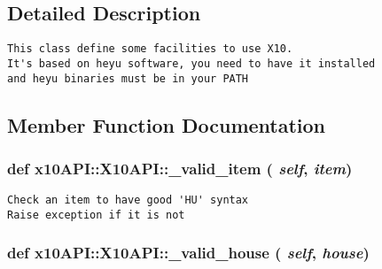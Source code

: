 \subsection{Detailed Description}


\footnotesize\begin{verbatim}
This class define some facilities to use X10.
It's based on heyu software, you need to have it installed
and heyu binaries must be in your PATH
\end{verbatim}
\normalsize
 

\subsection{Member Function Documentation}
\hypertarget{classx10API_1_1X10API_398d98e0674a6cefaef1154eafe94a15}{
\subsubsection[\_\-valid\_\-item]{\setlength{\rightskip}{0pt plus 5cm}def x10API::X10API::\_\-valid\_\-item ( {\em self}, \/   {\em item})}}
\label{classx10API_1_1X10API_398d98e0674a6cefaef1154eafe94a15}




\footnotesize\begin{verbatim}
Check an item to have good 'HU' syntax
Raise exception if it is not
\end{verbatim}
\normalsize
 \hypertarget{classx10API_1_1X10API_e9639dcec52e0f507fcc224a6c377c7d}{
\subsubsection[\_\-valid\_\-house]{\setlength{\rightskip}{0pt plus 5cm}def x10API::X10API::\_\-valid\_\-house ( {\em self}, \/   {\em house})}}
\label{classx10API_1_1X10API_e9639dcec52e0f507fcc224a6c377c7d}




